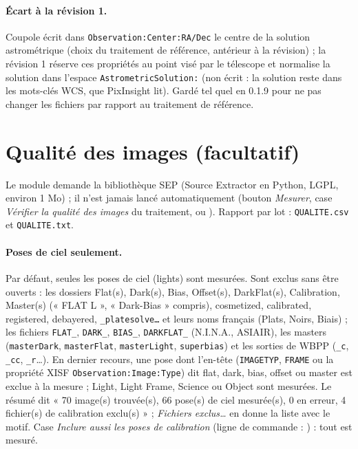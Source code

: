 \paragraph{Écart à la révision 1.} Coupole écrit dans \texttt{Observation:Center:RA/Dec} le centre de la solution
astrométrique (choix du traitement de référence, antérieur à la révision) ; la révision 1 réserve ces propriétés au
point visé par le télescope et normalise la solution dans l'espace \texttt{AstrometricSolution:} (non écrit : la
solution reste dans les mots-clés WCS, que PixInsight lit). Gardé tel quel en 0.1.9 pour ne pas changer les fichiers
par rapport au traitement de référence.

\section{Qualité des images (facultatif)}\label{sec:qualite}
Le module demande la bibliothèque SEP (Source Extractor en Python, LGPL, environ 1 Mo) ; il n'est jamais lancé
automatiquement (bouton \emph{Mesurer}, case \emph{Vérifier la qualité des images} du traitement, ou
). Rapport par lot : \texttt{QUALITE.csv} et \texttt{QUALITE.txt}.

\paragraph{Poses de ciel seulement.} Par défaut, seules les poses de ciel (lights) sont mesurées. Sont exclus sans
être ouverts : les dossiers Flat(s), Dark(s), Bias, Offset(s), DarkFlat(s), Calibration, Master(s) (« FLAT L »,
« Dark-Bias » compris), cosmetized, calibrated, registered, debayered, \texttt{\_platesolve…} et leurs noms
français (Plats, Noirs, Biais) ; les fichiers \texttt{FLAT\_}, \texttt{DARK\_}, \texttt{BIAS\_},
\texttt{DARKFLAT\_} (N.I.N.A., ASIAIR), les masters (\texttt{masterDark}, \texttt{masterFlat},
\texttt{masterLight}, \texttt{superbias}) et les sorties de WBPP (\texttt{\_c}, \texttt{\_cc}, \texttt{\_r}…).
En dernier recours, une pose dont l'en-tête (\texttt{IMAGETYP}, \texttt{FRAME} ou la propriété XISF
\texttt{Observation:Image:Type}) dit flat, dark, bias, offset ou master est exclue à la mesure ; Light, Light Frame,
Science ou Object sont mesurées. Le résumé dit « 70 image(s) trouvée(s), 66 pose(s) de ciel mesurée(s), 0 en erreur,
4 fichier(s) de calibration exclu(s) » ; \emph{Fichiers exclus…} en donne la liste avec le motif. Case
\emph{Inclure aussi les poses de calibration} (ligne de commande : ) : tout est mesuré.

